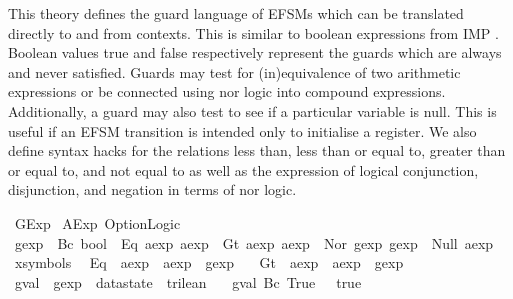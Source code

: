 %
\begin{isabellebody}%
%
%
\isadelimdocument
%
\endisadelimdocument
%
\isatagdocument
%
\isamarkuptrue%
%
\endisatagdocument
{\isafolddocument}%
%
\isadelimdocument
%
\endisadelimdocument
%
\begin{isamarkuptext}%
This theory defines the guard language of EFSMs which can be translated directly to and from
contexts. This is similar to boolean expressions from IMP \cite{fixme}. Boolean values true and
false respectively represent the guards which are always and never satisfied. Guards may test
for (in)equivalence of two arithmetic expressions or be connected using nor logic into compound
expressions. Additionally, a guard may also test to see if a particular variable is null. This is
useful if an EFSM transition is intended only to initialise a register.  We also define syntax hacks
for the relations less than, less than or equal to, greater than or equal to, and not equal to as
well as the expression of logical conjunction, disjunction, and negation in terms of nor logic.%
\end{isamarkuptext}\isamarkuptrue%
%
\isadelimtheory
%
\endisadelimtheory
%
\isatagtheory
{}\isamarkupfalse%
\ GExp\isanewline
{}\ AExp\ Option{\isacharunderscore}Logic\isanewline
{}%
\endisatagtheory
{\isafoldtheory}%
%
\isadelimtheory
%
\endisadelimtheory
\isanewline
\isanewline
\isanewline
\isanewline
\isanewline
\ \ \isanewline
\isanewline
{}\isamarkupfalse%
\ gexp\ {\isacharequal}\ Bc\ bool\ {\isacharbar}\ Eq\ aexp\ aexp\ {\isacharbar}\ Gt\ aexp\ aexp\ {\isacharbar}\ Nor\ gexp\ gexp\ {\isacharbar}\ Null\ aexp\isanewline
\isanewline
{}\isamarkupfalse%
\ {\isacharparenleft}xsymbols{\isacharparenright}\isanewline
\ \ Eq\ {\isacharcolon}{\isacharcolon}\ {\isachardoublequoteopen}aexp\ {\isasymRightarrow}\ aexp\ {\isasymRightarrow}\ gexp{\isachardoublequoteclose}\ \isanewline
\ \ Gt\ {\isacharcolon}{\isacharcolon}\ {\isachardoublequoteopen}aexp\ {\isasymRightarrow}\ aexp\ {\isasymRightarrow}\ gexp{\isachardoublequoteclose}\ \isanewline
\isanewline
{}\isamarkupfalse%
\ gval\ {\isacharcolon}{\isacharcolon}\ {\isachardoublequoteopen}gexp\ {\isasymRightarrow}\ datastate\ {\isasymRightarrow}\ trilean{\isachardoublequoteclose}\ \isanewline
\ \ {\isachardoublequoteopen}gval\ {\isacharparenleft}Bc\ True{\isacharparenright}\ {\isacharunderscore}\ {\isacharequal}\ true{\isachardoublequoteclose}\ {\isacharbar}\isanewline

\end{isabellebody}
